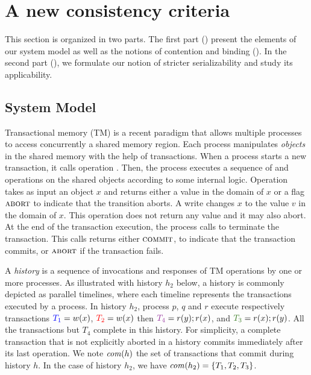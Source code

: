 \section{A new consistency criteria}

This section is organized in two parts.
The first part () present the elements of our system model as well as the notions of contention and binding ().
In the second part (), we formulate our notion of stricter serializability and study its applicability.

\subsection{System Model}

Transactional memory (TM) is a recent paradigm that allows multiple processes to access concurrently a shared memory region.
Each process manipulates \emph{objects} in the shared memory with the help of transactions.
When a process starts a new transaction, it calls operation \stmBeginFunction.
Then, the process executes a sequence of \stmReadFunction and \stmWriteFunction operations on the shared objects according to some internal logic.
Operation  takes as input an object $x$ and returns either a value in the domain of $x$ or a flag $\text{\textsc{abort}}$ to indicate that the transition aborts.
A write  changes $x$ to the value $v$ in the domain of $x$.
This operation does not return any value and it may also abort.
At the end of the transaction execution, the process calls \stmTryCommitFunction to terminate the transaction.
This calls returns either $\text{\textsc{commit}}$, to indicate that the transaction commits, or $\text{\textsc{abort}}$ if the transaction fails.

A \emph{history} is a sequence of invocations and responses of TM operations by one or more processes.
As illustrated with history $h_2$ below, a history is commonly depicted as parallel timelines, where each timeline represents the transactions executed by a process.
In history $h_2$, process $p$, $q$ and $r$ execute respectively transactions ${\color{blue}{T_1}}=w(x)$, ${\color{red}{T_2}}=w(x)$ then ${\color{Purple}{T_4}}=r(y);r(x)$, and ${\color{OliveGreen}{T_3}}=r(x);r(y)$.
All the transactions but $T_4$ complete in this history.
For simplicity, a complete transaction that is not explicitly aborted in a history commits immediately after its last operation.
We note $\committed{h}$ the set of transactions that commit during history $h$.
In the case of history $h_2$, we have $\committed{h_2}=\{T_1,T_2,T_3\}$.

